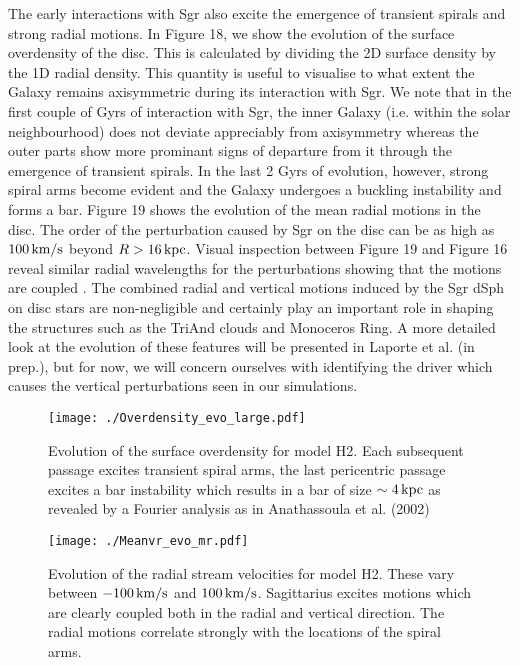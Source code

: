 \documentclass[useAMS,usenatbib]{mnras}
\begin{document}
The early interactions with Sgr also excite the emergence of transient spirals and strong radial motions. In Figure 18, we show the evolution of the surface overdensity of the disc. This is calculated by dividing the 2D surface density by the 1D radial density. This quantity is useful to visualise to what extent the Galaxy remains axisymmetric during its interaction with Sgr. We note that in the first couple of Gyrs of interaction with Sgr, the inner Galaxy (i.e. within the solar neighbourhood) does not deviate appreciably from axisymmetry whereas the outer parts show more prominant signs of departure from it through the emergence of transient spirals. In the last 2 Gyrs of evolution, however, strong spiral arms become evident and the Galaxy undergoes a buckling instability and forms a bar. Figure 19 shows the evolution of the mean radial motions in the disc. The order of the perturbation caused by Sgr on the disc can be as high as $100\,\rm{km/s}$ beyond $R>16\, \rm{kpc}$. Visual inspection between Figure 19 and Figure 16 reveal similar radial wavelengths for the perturbations showing that the motions are coupled \cite{d'onghia16}. The combined radial and vertical motions induced by the Sgr dSph on disc stars are non-negligible and certainly play an important role in shaping the structures such as the TriAnd clouds and Monoceros Ring. A more detailed look at the evolution of these features will be presented in Laporte et al. (in prep.), but for now, we will concern ourselves with identifying the driver which causes the vertical perturbations seen in our simulations.

\begin{figure}
\texttt{[image: ./Overdensity\_evo\_large.pdf]}
\caption[]{Evolution of the surface overdensity for model H2. Each subsequent passage excites transient spiral arms, the last pericentric passage excites a bar instability which results in a bar of size $\sim4\,{\rm{kpc}}$ as revealed by a Fourier analysis as in Anathassoula et al. (2002)}
\end{figure}


\begin{figure}
\texttt{[image: ./Meanvr\_evo\_mr.pdf]}
\caption[]{Evolution of the radial stream velocities for model H2. These vary between $-100\,\rm{km/s}$ and $100 \,\rm{km/s}$. Sagittarius excites motions which are clearly coupled both in the radial and vertical direction. The radial motions correlate strongly with the locations of the spiral arms.}
\end{figure}
\end{document}
